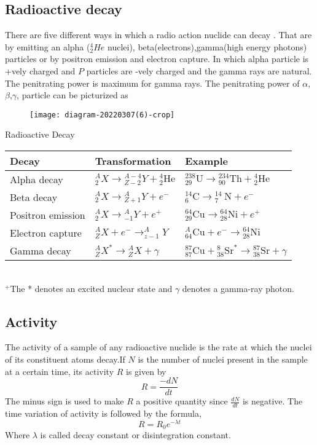 \subsection{Radioactive decay}
There are five different ways in which a radio action nuclide can decay . That are by emitting an alpha ($ ^4_2He$ nuclei), beta(electrons),gamma(high energy photons) particles or by positron emission  and electron capture. In which alpha particle is +vely charged and $P$ particles are -vely charged and the gamma rays are natural. The penitrating power is maximum for  gamma rays. The penitrating power of $\alpha$,$\beta$,$\gamma$, particle can be picturized as\\
\begin{figure}[H]
	\centering
	\texttt{[image: diagram-20220307(6)-crop]}
	\caption{}
	\label{}
\end{figure}
 Radioactive Decay\\
 \renewcommand*{\arraystretch}{1.5}
\begin{tabular}{lll}
	\hline Decay & Transformation & Example \\
	\hline Alpha decay & ${ }_{2}^{A} X \rightarrow{ }_{Z-2}^{A-4} Y+{ }_{2}^{4} \mathrm{He}$ & ${ }_{29}^{238} \mathrm{U} \rightarrow{ }_{90}^{234} \mathrm{Th}+{ }_{2}^{4} \mathrm{He}$ \\
	Beta decay & ${ }_{2}^{A} X \rightarrow{ }_{Z+1}^{A} Y+e^{-}$ & ${ }_{6}^{14} \mathrm{C} \rightarrow{ }_{7}^{14} \mathrm{~N}+e^{-}$ \\
	Positron emission & ${ }_{2}^{A} X \rightarrow{ }_{-1}^{A} Y+e^{+}$ & ${ }_{29}^{64} \mathrm{Cu} \rightarrow{ }_{28}^{64} \mathrm{Ni}+e^{+}$ \\
	Electron capture & ${ }_{Z}^{A} X+e^{-} \rightarrow_{z-1}^{A} Y$ & ${ }_{64}^{A} \mathrm{Cu}+e^{-} \rightarrow{ }_{28}^{64} \mathrm{Ni}$ \\
	Gamma decay & ${ }_{Z}^{A} X^{*} \rightarrow{ }_{Z}^{A} X+\gamma$ & ${ }_{87}^{87} \mathrm{Cu}+{ }_{38}^{8} \mathrm{Sr}^{*} \rightarrow{ }_{38}^{87} \mathrm{Sr}+\gamma$ \\
	\hline
\end{tabular}\\
${ }^{+}$The * denotes an excited nuclear state and $\gamma$ denotes a gamma-ray photon.
\subsection{Activity}
The activity of a sample of any radioactive nuclide is the rate at which the nuclei of its constituent atoms decay.If $N$ is the number of nuclei present in the sample at a certain time, its activity $R$ is given by
$$R=\frac{-dN}{dt}$$
The minus sign is used to make $R$ a positive quantity since $\frac{dN}{dt}$ is negative. The time variation of activity is followed by the formula, 
$$R=R_0e^{-\lambda t}$$
Where $\lambda$ is called decay constant or disintegration constant.
